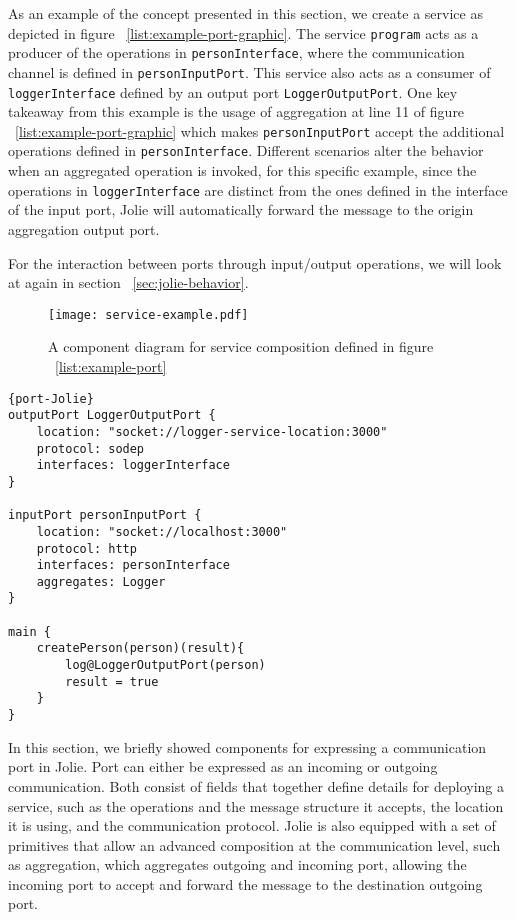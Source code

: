 \FloatBarrier

As an example of the concept presented in this section, we create a service as depicted in figure ~\ref{list:example-port-graphic}.
The service \texttt{program} acts as a producer of the operations in \texttt{personInterface}, where the communication channel is defined in \texttt{personInputPort}.
This service also acts as a consumer of \texttt{loggerInterface} defined by an output port \texttt{LoggerOutputPort}.
One key takeaway from this example is the usage of aggregation at line 11 of figure ~\ref{list:example-port-graphic} which makes \texttt{personInputPort} accept the additional operations defined in \texttt{personInterface}. Different scenarios alter the behavior when an aggregated operation is invoked, for this specific example, since the operations in \texttt{loggerInterface} are distinct from the ones defined in the interface of the input port, Jolie will automatically forward the message to the origin aggregation output port.

For the interaction between ports through input/output operations, we will look at again in section ~\ref{sec:jolie-behavior}.

\begin{figure}[]
    \texttt{[image: service-example.pdf]}
    \centering
    \caption{A component diagram for service composition defined in figure ~\ref{list:example-port}}
    \label{figure:example-port-graphic}
\end{figure}

\begin{listing}[]
    \lstset{language=Jolie,
        style=codeStyle,
        numbers=left,
        firstnumber=1
    }
    \begin{lstlisting}[frame=tlrb]{port-Jolie}
outputPort LoggerOutputPort {
    location: "socket://logger-service-location:3000"
    protocol: sodep
    interfaces: loggerInterface
}

inputPort personInputPort {
    location: "socket://localhost:3000"
    protocol: http
    interfaces: personInterface
    aggregates: Logger
}

main {
    createPerson(person)(result){
        log@LoggerOutputPort(person)
        result = true
    }
}
\end{lstlisting}
    \caption{Jolie implementation of port declaration}
    \label{list:example-port}
\end{listing}

In this section, we briefly showed components for expressing a communication port in Jolie. Port can either be expressed as an incoming or outgoing communication. Both consist of fields that together define details for deploying a service, such as the operations and the message structure it accepts, the location it is using, and the communication protocol. Jolie is also equipped with a set of primitives that allow an advanced composition at the communication level, such as aggregation, which aggregates outgoing and incoming port, allowing the incoming port to accept and forward the message to the destination outgoing port.

\FloatBarrier
